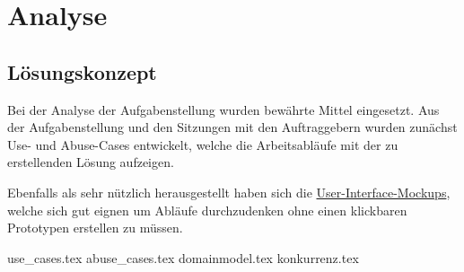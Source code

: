 \chapter{Analyse}
\section{Lösungskonzept}

Bei der Analyse der Aufgabenstellung wurden bewährte Mittel eingesetzt. Aus der Aufgabenstellung und den Sitzungen mit den Auftraggebern wurden zunächst Use- und Abuse-Cases entwickelt, welche die Arbeitsabläufe mit der zu erstellenden Lösung aufzeigen.

Ebenfalls als sehr nützlich herausgestellt haben sich die \hyperref[design:mockups]{User-Interface-Mockups}, welche sich gut eignen um Abläufe durchzudenken ohne einen klickbaren Prototypen erstellen zu müssen.

\clearpage
{use_cases.tex}
\clearpage
{abuse_cases.tex}
\clearpage
{domainmodel.tex}
\clearpage
{konkurrenz.tex}

